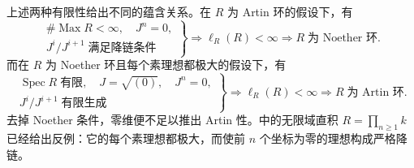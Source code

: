 上述两种有限性给出不同的蕴含关系。在 \(R\) 为 Artin 环的假设下，有
\[
	\left.
	\begin{gathered}
		\#\operatorname{Max}R<\infty,\quad J^n=0,\\
		J^i/J^{i+1}\;\text{满足降链条件}
	\end{gathered}
	\right\} \Longrightarrow\ell_R(R)<\infty \Longrightarrow R\;\text{为 Noether 环}.
\]
而在 \(R\) 为 Noether 环且每个素理想都极大的假设下，有
\[
	\left.
	\begin{gathered}
		\operatorname{Spec}R\;\text{有限},\quad J=\sqrt{(0)},\quad J^n=0,\\
		J^i/J^{i+1}\;\text{有限生成}
	\end{gathered}
	\right\} \Longrightarrow\ell_R(R)<\infty \Longrightarrow R\;\text{为 Artin 环}.
\]
\ProseParagraphBreak
去掉 Noether 条件，零维便不足以推出 Artin 性。中的无限域直积 \(R=\prod_{n\ge1}k\) 已经给出反例：它的每个素理想都极大，而使前 \(n\) 个坐标为零的理想构成严格降链。
